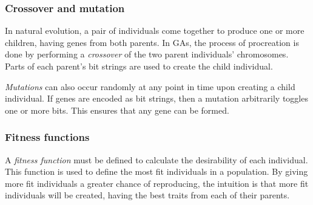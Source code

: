 
\subsubsection{Crossover and mutation}
In natural evolution, a pair of individuals come together to produce one or more children, having genes from both parents. In GAs, the process of procreation is done by performing a \emph{crossover} of the two parent individuals' chromosomes. Parts of each parent's bit strings are used to create the child individual.

\emph{Mutations} can also occur randomly at any point in time upon creating a child individual. If genes are encoded as bit strings, then a mutation arbitrarily toggles one or more bits. This ensures that any gene can be formed.

\subsubsection{Fitness functions}
A \emph{fitness function} must be defined to calculate the desirability of each individual. This function is used to define the most fit individuals in a population. By giving more fit individuals a greater chance of reproducing, the intuition is that more fit individuals will be created, having the best traits from each of their parents.

